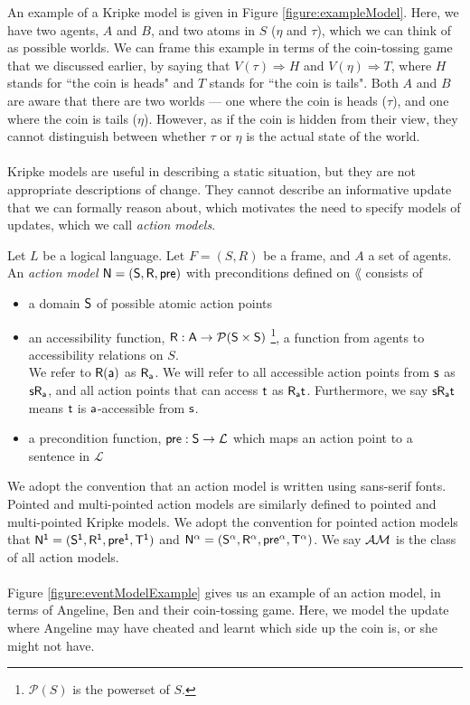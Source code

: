An example of a Kripke model is given in Figure \ref{figure:exampleModel}.
Here, we have two agents, $A$ and $B$, and two atoms in $S$ ($\eta$ and $\tau$), which we can think
of as possible worlds.
We can frame this example in terms of the coin-tossing game that we discussed earlier, by saying
that $V(\tau) \Rightarrow H$ and $V(\eta) \Rightarrow T$, where $H$ stands for ``the coin is heads"
and $T$ stands for ``the coin is tails".
Both $A$ and $B$ are aware that there are two worlds --- one where the coin is heads ($\tau$), and one
where the coin is tails ($\eta$).
However, as if the coin is hidden from their view, they cannot distinguish between whether $\tau$ or
$\eta$ is the actual state of the world.\\
\\
Kripke models are useful in describing a static situation, but they are not appropriate descriptions
of change.
They cannot describe an informative update that we can formally reason about, which motivates the
need to specify models of updates, which we call {\em action models}.

\begin{defn} \label{evModel}
	Let $L$ be a logical language.
	Let $F = (S, R)$ be a frame, and $A$ a set of agents.
	An {\em action model} $\mathrm{\mathsf{\mathrm{\mathsf{N}} = (S, R, pre)}}$ with preconditions defined
  on $\lang$ consists of
	\begin{itemize}
		\item a domain $\mathrm{\mathsf{S}}$ of possible atomic action points
		\item an accessibility function, $\mathrm{\mathsf{R: A \to \mathcal{P}(S \times
        S)}}$ \footnote{$\mathcal{P}(S)$ is the powerset of $S$.}, a function from agents to
		accessibility relations on $S$.\\
		We refer to $\mathrm{\mathsf{R(a)}}$ as $\mathrm{\mathsf{R_a}}$.
		We will refer to all accessible action points from $\mathrm{\mathsf{s}}$ as
    $\mathrm{\mathsf{s R_a}}$, and all action points that
		can access $\mathrm{\mathsf{t}}$ as $\mathrm{\mathsf{R_a t}}$.
		Furthermore, we say $\mathrm{\mathsf{s R_a t}}$ means $\mathrm{\mathsf{t}}$ is
    $\mathrm{\mathsf{a}}$-accessible from $\mathrm{\mathsf{s}}$.
		\item a precondition function, $\mathrm{\mathsf{pre: S}} \to \mathcal{L}$ which maps an action point to a
		sentence in $\mathcal{L}$
	\end{itemize}
\end{defn}

We adopt the convention that an action model is written using sans-serif fonts.
Pointed and multi-pointed action models are similarly defined to pointed and multi-pointed Kripke
models.
We adopt the convention for pointed action models that $\mathrm{\mathsf{\mathrm{\mathsf{N}}^1 = (S^1, R^1,
pre^1, T^1)}}$ and $\mathrm{\mathsf{\mathrm{\mathsf{N}}^\alpha =
  (S^\alpha,R^\alpha,pre^\alpha,T^\alpha)}}$.
We say $\mathcal{AM}$ is the class of all action models.\\
\\
Figure \ref{figure:eventModelExample} gives us an example of an action model, in terms of Angeline, Ben and
their coin-tossing game.
Here, we model the update where Angeline may have cheated and learnt which side up the coin is, or she might not have.

